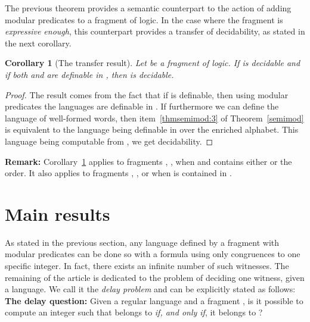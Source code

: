 \documentclass[submission,hidelink]{dmtcs-episciences}
\newtheorem{corollary}[theorem]{Corollary}
\begin{document}
	The previous theorem provides a semantic counterpart to the action of adding modular predicates to a fragment of logic. In the case where
	the fragment is \emph{expressive enough}, this counterpart provides a transfer of decidability, as stated in the next
	corollary.
	\begin{corollary}[The transfer result]\label{Cor:transfer}
		Let  be a fragment of logic. If  is decidable and if both  and 
		are
		definable in
		, then
		 is decidable.
	\end{corollary}
	\begin{proof}
	The result comes from the fact that if  is definable, then using modular predicates the languages  are definable in .
	If furthermore we can define the language of well-formed words, then item~\ref{thmsemimod:3} of Theorem~\ref{semimod} is equivalent to the language  being definable in  over the enriched alphabet.
	This language being computable from , we get decidability.
	\end{proof}
	\textbf{Remark:} Corollary~\ref{Cor:transfer} applies to fragments , , when  and  contains either  or the order. It
	also applies to fragments , ,  or  when
	 is contained in .

\section{Main results}\label{Section:Main}

As stated in the previous section, any language defined by a fragment with modular predicates can be done so with a formula using only congruences to one specific integer.
In fact, there exists an infinite number of such witnesses.
The remaining of the article is dedicated to the problem of deciding one witness, given a language.
We call it the \emph{delay problem} and can be explicitly stated as follows:\\
\noindent\textbf{The delay question:}
Given a regular language  and a fragment , is it possible to compute an integer  such that  belongs to  \emph{if, and only if}, it belongs to ?\\
\end{document}

